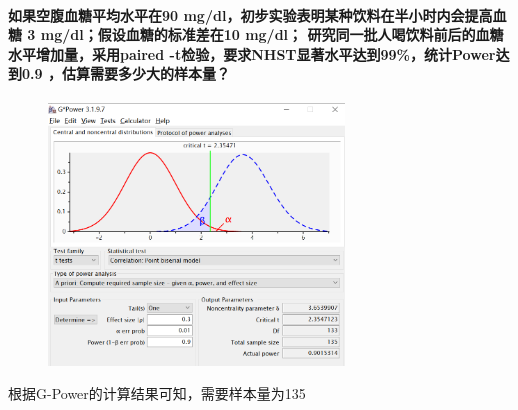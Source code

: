 \documentclass[11pt]{ctexart}
\makeatletter
\newcommand{\boxspacing}{\kern\kvtcb@left@rule\kern\kvtcb@boxsep}
\newcommand{\prompt}[4]{
        \ttfamily\llap{{\color{#2}[#3]:\hspace{3pt}#4}}\vspace{-\baselineskip}
    }
\makeatother
\begin{document}
\hypertarget{ux5982ux679cux7a7aux8179ux8840ux7cd6ux5e73ux5747ux6c34ux5e73ux572890-mgdlux521dux6b65ux5b9eux9a8cux8868ux660eux67d0ux79cdux996eux6599ux5728ux534aux5c0fux65f6ux5185ux4f1aux63d0ux9ad8ux8840ux7cd6-3-mgdlux5047ux8bbeux8840ux7cd6ux7684ux6807ux51c6ux5deeux572810-mgdl-ux7814ux7a76ux540cux4e00ux6279ux4ebaux559dux996eux6599ux524dux540eux7684ux8840ux7cd6ux6c34ux5e73ux589eux52a0ux91cfux91c7ux7528paired--tux68c0ux9a8cux8981ux6c42nhstux663eux8457ux6c34ux5e73ux8fbeux523099ux7edfux8ba1powerux8fbeux52300.9-ux4f30ux7b97ux9700ux8981ux591aux5c11ux5927ux7684ux6837ux672cux91cf}{%
    \paragraph{如果空腹血糖平均水平在90
        mg/dl，初步实验表明某种饮料在半小时内会提高血糖 3
        mg/dl；假设血糖的标准差在10 mg/dl；
        研究同一批人喝饮料前后的血糖水平增加量，采用paired
        -t检验，要求NHST显著水平达到99\%，统计Power达到0.9
        ，估算需要多少大的样本量？}\label{ux5982ux679cux7a7aux8179ux8840ux7cd6ux5e73ux5747ux6c34ux5e73ux572890-mgdlux521dux6b65ux5b9eux9a8cux8868ux660eux67d0ux79cdux996eux6599ux5728ux534aux5c0fux65f6ux5185ux4f1aux63d0ux9ad8ux8840ux7cd6-3-mgdlux5047ux8bbeux8840ux7cd6ux7684ux6807ux51c6ux5deeux572810-mgdl-ux7814ux7a76ux540cux4e00ux6279ux4ebaux559dux996eux6599ux524dux540eux7684ux8840ux7cd6ux6c34ux5e73ux589eux52a0ux91cfux91c7ux7528paired--tux68c0ux9a8cux8981ux6c42nhstux663eux8457ux6c34ux5e73ux8fbeux523099ux7edfux8ba1powerux8fbeux52300.9-ux4f30ux7b97ux9700ux8981ux591aux5c11ux5927ux7684ux6837ux672cux91cf}}

\begin{figure}[H]
    \centering
    \includegraphics[width=0.7\textwidth]{7-2.png}
\end{figure}


根据G-Power的计算结果可知，需要样本量为135



\begin{tcolorbox}[breakable, size=fbox, boxrule=1pt, pad at break*=1mm,colback=cellbackground, colframe=cellborder]
    \prompt{In}{incolor}{ }{\boxspacing}
    \begin{Verbatim}[commandchars=\\\{\}]

    \end{Verbatim}
\end{tcolorbox}


\end{document}
